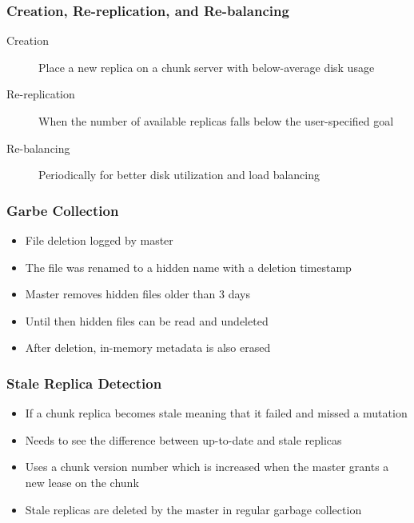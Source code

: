 \documentclass[12pt]{article}
\begin{document}
\subsubsection{Creation, Re-replication, and Re-balancing}
\begin{description}
    \item[Creation] Place a new replica on a chunk server with below-average disk usage
    \item[Re-replication] When the number of available replicas falls below the user-specified goal
    \item[Re-balancing] Periodically for better disk utilization and load balancing
\end{description}

\subsubsection{Garbe Collection}
\begin{itemize}
    \item File deletion logged by master
    \item The file was renamed to a hidden name with a deletion timestamp
    \item Master removes hidden files older than 3 days
    \item Until then hidden files can be read and undeleted
    \item After deletion, in-memory metadata is also erased
\end{itemize}

\subsubsection{Stale Replica Detection}
\begin{itemize}
    \item If a chunk replica becomes stale meaning that it failed and missed a mutation
    \item Needs to see the difference between up-to-date and stale replicas
    \item Uses a chunk version number which is increased when the master grants a new lease on the chunk
    \item Stale replicas are deleted by the master in regular garbage collection
\end{itemize}
\end{document}
